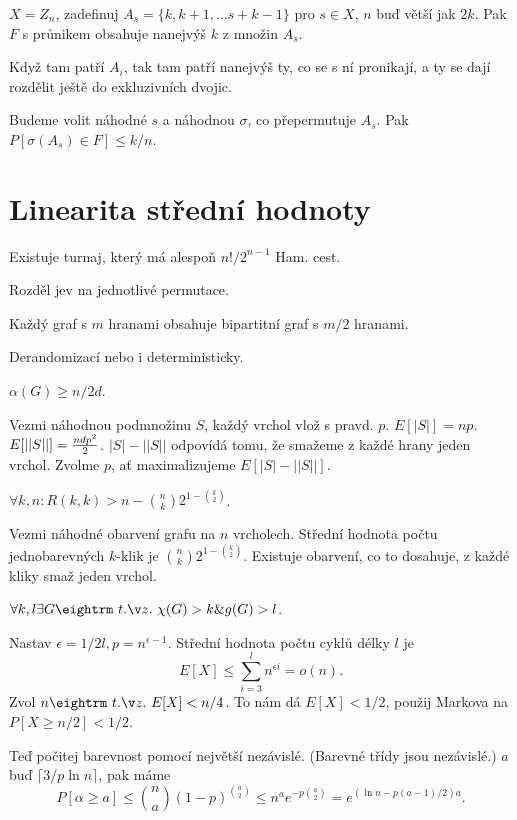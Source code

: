 \lem{} $X = Z_n$, zadefinuj $A_s = \{k,k+1,\dots s+k-1\}$ pro $s \in X$, $n$ buď
větší jak $2k$.  Pak $F$ s průnikem obsahuje nanejvýš $k$ z množin $A_s$.

\prf{} Když tam patří $A_i$, tak tam patří nanejvýš ty, co se s ní pronikají, a
ty se dají rozdělit ještě do exkluzivních dvojic.

 Budeme volit náhodné $s$ a náhodnou $\sigma$, co přepermutuje
$A_s$. Pak $P[\sigma(A_s) \in F] \le k/n$.

\section{Linearita střední hodnoty}

\thm{} Existuje turnaj, který má alespoň $n!/2^{n-1}$ Ham. cest.

\prf{} Rozděl jev na jednotlivé permutace. 

\thm{} Každý graf s $m$ hranami obsahuje bipartitní graf s $m/2$ hranami.

\prf{} Derandomizací nebo i deterministicky.


 $\alpha(G) \ge n/2d$.

\prf{} Vezmi náhodnou podmnožinu $S$, každý vrchol vlož s pravd. $p$.
$E[|S|] = np$. $E[||S||] = {ndp^2 \over 2}$. $|S| - ||S||$ odpovídá
tomu, že smažeme z každé hrany jeden vrchol. Zvolme $p$, ať
maximalizujeme $E[|S| - ||S||]$.

 $\forall k,n: R(k,k) > n - {n \choose k} 2^{1 - {k \choose 2}}$.

\prf{} Vezmi náhodné obarvení grafu na $n$ vrcholech. Střední hodnota
počtu jednobarevných $k$-klik je ${n \choose k} 2^{1 - {k \choose
2}}$. Existuje obarvení, co to dosahuje, z každé kliky smaž jeden
vrchol.

 $\forall k,l \exists G \st \chi(G) > k \& g(G) > l$.

\prf{} Nastav $\epsilon = 1/2l, p = n^{\epsilon-1}$. Střední hodnota počtu cyklů
délky $l$ je $$E[X] \le \sum_{i=3}^l n^{\epsilon i} = o(n).$$
Zvol $n \st E[X] < n/4$. To nám dá $E[X] < 1/2$, použij Markova na $P[X \ge n/2] < 1/2$.

Teď počitej barevnost pomocí největší nezávislé. (Barevné třídy jsou
nezávislé.) $a$ buď $\lceil 3/p \ln n \rceil$, pak máme
$$P[\alpha \ge a] \le {n \choose a} (1-p)^{{a \choose 2}} \le n^a e^{-p{a \choose 2}} =
e^{(\ln n -p(a-1)/2)a}.$$

